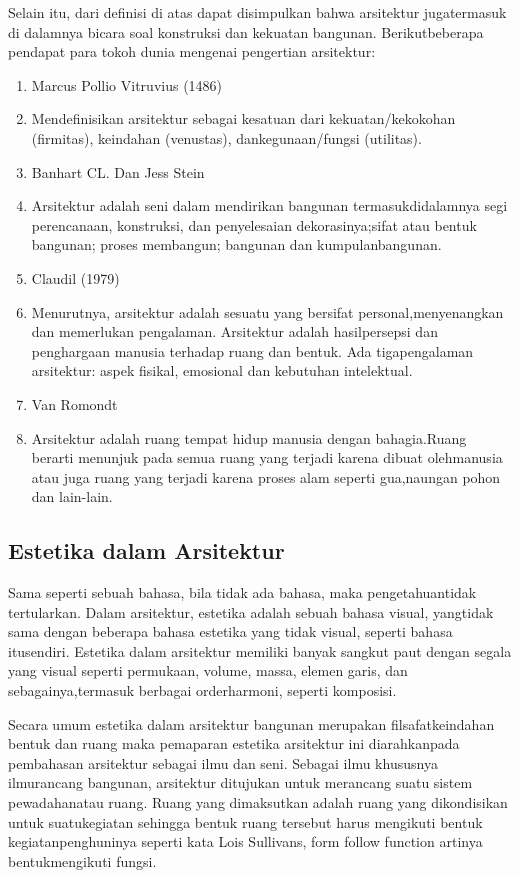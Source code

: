 \documentclass[../manperil.tex]{subfiles}
\begin{document}
Selain itu, dari definisi di atas dapat disimpulkan bahwa arsitektur jugatermasuk di dalamnya bicara soal konstruksi dan kekuatan bangunan. Berikutbeberapa pendapat para tokoh dunia mengenai pengertian arsitektur:

\begin{enumerate}
	\item Marcus Pollio Vitruvius (1486)
	\item[] Mendefinisikan arsitektur sebagai kesatuan dari kekuatan/kekokohan (firmitas), keindahan (venustas), dankegunaan/fungsi (utilitas).

	\item Banhart CL. Dan Jess Stein
	\item[] Arsitektur adalah seni dalam mendirikan bangunan termasukdidalamnya segi perencanaan, konstruksi, dan penyelesaian dekorasinya;sifat atau bentuk bangunan; proses membangun; bangunan dan kumpulanbangunan.

	\item Claudil (1979)
	\item[] Menurutnya, arsitektur adalah sesuatu yang bersifat personal,menyenangkan dan memerlukan pengalaman. Arsitektur adalah hasilpersepsi dan penghargaan manusia terhadap ruang dan bentuk. Ada tigapengalaman arsitektur: aspek fisikal, emosional dan kebutuhan intelektual.

	\item Van Romondt
	\item[] Arsitektur adalah ruang tempat hidup manusia dengan bahagia.Ruang berarti menunjuk pada semua ruang yang terjadi karena dibuat olehmanusia atau juga ruang yang terjadi karena proses alam seperti gua,naungan pohon dan lain-lain.
\end{enumerate}

\subsection{Estetika dalam Arsitektur}%
\label{sub:Estetika dalam Arsitektur}
Sama seperti sebuah bahasa, bila tidak ada bahasa, maka pengetahuantidak tertularkan. Dalam arsitektur, estetika adalah sebuah bahasa visual, yangtidak sama dengan beberapa bahasa estetika yang tidak visual, seperti bahasa itusendiri. Estetika dalam arsitektur memiliki banyak sangkut paut dengan segala yang visual seperti permukaan, volume, massa, elemen garis, dan sebagainya,termasuk berbagai orderharmoni, seperti komposisi.

Secara umum estetika dalam arsitektur bangunan merupakan filsafatkeindahan bentuk dan ruang maka pemaparan estetika arsitektur ini diarahkanpada pembahasan arsitektur sebagai ilmu dan seni. Sebagai ilmu khususnya ilmurancang bangunan, arsitektur ditujukan untuk merancang suatu sistem pewadahanatau ruang. Ruang yang dimaksutkan adalah ruang yang dikondisikan untuk suatukegiatan sehingga bentuk ruang tersebut harus mengikuti bentuk kegiatanpenghuninya seperti kata Lois Sullivans, form follow function artinya bentukmengikuti fungsi.
\end{document}
